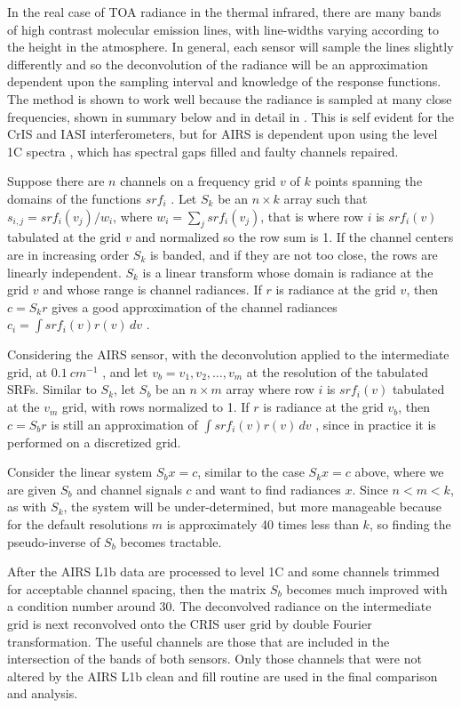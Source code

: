 \documentclass[11pt]{article}
\begin{document}
In the real case of TOA radiance in the thermal infrared, there are many bands of high contrast molecular emission lines, with line-widths varying according to the height in the atmosphere. In general, each sensor will sample the lines slightly differently and so the deconvolution of the radiance will be an approximation dependent upon the sampling interval and knowledge of the response functions. The method is shown to work well because the radiance is sampled at many close frequencies, shown in summary below and in detail in \cite{Motteler2017a}. This is self evident for the CrIS and IASI interferometers, but for AIRS is dependent upon using the level 1C spectra \cite{}, which has spectral gaps filled and faulty channels repaired.

Suppose there are \(n\) channels on a frequency grid \(v\) of \(k\) points spanning the domains of the functions \(srf_i\) . Let \(S_k\) be an \(n\times k\) array such that \(s_{i,j} = srf_i(v_j)/w_i\), where \(w_i = \sum_j srf_i(v_j)\), that is where row \(i\) is \(srf_i(v)\) tabulated at the grid \(v\) and normalized so the row sum is 1.  If the channel centers are in increasing order \(S_k\) is banded, and if they are not too close,  the rows are linearly independent.  \(S_k\) is a linear transform whose domain is radiance at the grid \(v\) and whose range is channel radiances.  If \(r\) is radiance at the grid \(v\), then \(c = S_k r\) gives a good approximation of the channel radiances \(c_i = \int srf_i(v)r(v)\,dv\) .

Considering the AIRS sensor, with the deconvolution applied to the intermediate grid, at \(0.1\ cm^{-1}\) , and let \(v_b = v_1,v_2,\ldots,v_m\) at the resolution of the tabulated SRFs.  Similar to \(S_k\), let \(S_b\) be an \(n\times m\) array where row \(i\) is \(srf_i(v)\) tabulated at the \(v_m\) grid, with rows normalized to 1. If \(r\) is radiance at the grid \(v_b\), then \(c = S_b r\) is still an approximation of \(\int srf_i(v)r(v)\,dv\) , since in practice it is performed on a discretized grid.

Consider the linear system \(S_b x = c\), similar to the case \(S_k x = c\) above, where we are given \(S_b\) and channel signals \(c\) and want to find radiances \(x\).  Since \(n < m < k\), as with \(S_k\), the system will be under-determined, but more manageable because for the default resolutions \(m\) is approximately 40 times less than \(k\), so finding the pseudo-inverse of \(S_b\) becomes tractable.

After the AIRS L1b data are processed to level 1C and some channels trimmed for acceptable channel spacing, then the matrix \(S_b\) becomes much improved with a condition number around 30. The deconvolved radiance on the intermediate grid is next reconvolved onto the CRIS user grid by double Fourier transformation. The useful channels are those that are included in the intersection of the bands of both sensors.  Only those channels that were not altered by the AIRS L1b clean and fill routine are used in the final comparison and analysis.
\end{document}
